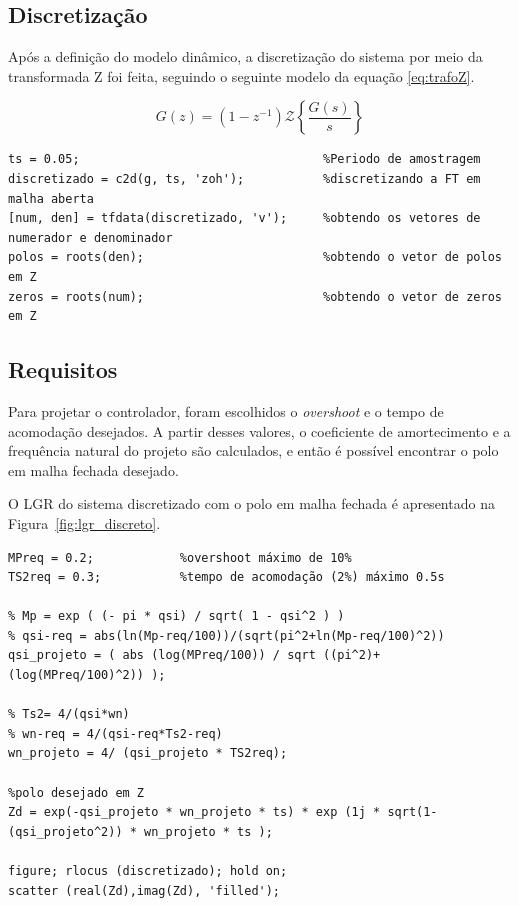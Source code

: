 \documentclass{article}
\begin{document}
\subsection{Discretização}

Após a definição do modelo dinâmico, a discretização do sistema por meio da transformada Z foi feita, seguindo o seguinte modelo da equação \ref{eq:trafoZ}.

\begin{equation}
    G(z) = (1-z^{-1}) \mathscr{Z}\left\{\frac{G(s)}{s}\right\}
    \label{eq:trafoZ}
\end{equation}

\begin{lstlisting}
ts = 0.05;                                  %Periodo de amostragem
discretizado = c2d(g, ts, 'zoh');           %discretizando a FT em malha aberta
[num, den] = tfdata(discretizado, 'v');     %obtendo os vetores de numerador e denominador
polos = roots(den);                         %obtendo o vetor de polos em Z
zeros = roots(num);                         %obtendo o vetor de zeros em Z
\end{lstlisting}

\subsection{Requisitos}
{
    Para projetar o controlador, foram escolhidos o \textit{overshoot} e o tempo de acomodação desejados. A partir desses valores, o coeficiente de amortecimento e a frequência natural do projeto são calculados, e então é possível encontrar o polo em malha fechada desejado.
    
    O LGR do sistema discretizado com o polo em malha fechada é apresentado na Figura~\ref{fig:lgr_discreto}.
}

\begin{lstlisting}
MPreq = 0.2;            %overshoot máximo de 10%
TS2req = 0.3;           %tempo de acomodação (2%) máximo 0.5s

% Mp = exp ( (- pi * qsi) / sqrt( 1 - qsi^2 ) )
% qsi-req = abs(ln(Mp-req/100))/(sqrt(pi^2+ln(Mp-req/100)^2))
qsi_projeto = ( abs (log(MPreq/100)) / sqrt ((pi^2)+(log(MPreq/100)^2)) );

% Ts2= 4/(qsi*wn)
% wn-req = 4/(qsi-req*Ts2-req)
wn_projeto = 4/ (qsi_projeto * TS2req);

%polo desejado em Z
Zd = exp(-qsi_projeto * wn_projeto * ts) * exp (1j * sqrt(1-(qsi_projeto^2)) * wn_projeto * ts );

figure; rlocus (discretizado); hold on;
scatter (real(Zd),imag(Zd), 'filled');
\end{lstlisting}
\end{document}
